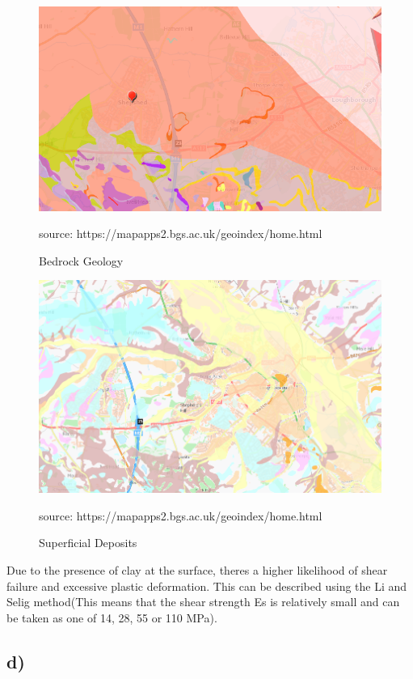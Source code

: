 \documentclass[letterpaper,12pt,leqno]{article}
\begin{document}
	\begin{figure}[H]
		\centering
		\includegraphics[width=0.8\linewidth]{figure/bedrock.png}
		\caption{Bedrock Geology}
		\small{source: https://mapapps2.bgs.ac.uk/geoindex/home.html}
		\label{fig:bedrock}
	\end{figure}
	\begin{figure}[H]
		\centering
		\includegraphics[width=0.8\linewidth]{figure/superfiicial_deposits.png}   
		\caption{Superficial Deposits}
			\small{source: https://mapapps2.bgs.ac.uk/geoindex/home.html}
		\label{fig:superficial}
	\end{figure}
	
	Due to the presence of clay at the surface, there\textquotesingle s a
	higher likelihood of shear failure and excessive plastic deformation.
	This can be described using the Li and Selig method(This means that the
	shear strength Es is relatively small and can be taken as one of 14, 28,
	55 or 110 MPa).
	
	\subsection{d)}\label{4uxff09}
	
\end{document}
